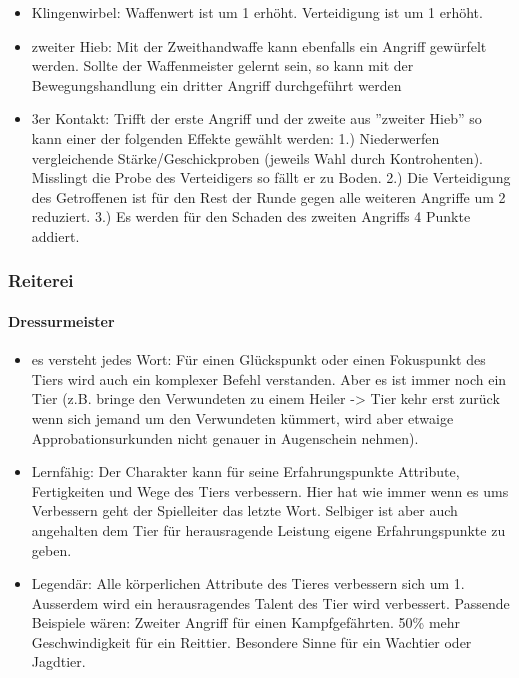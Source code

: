 \documentclass{article}
\begin{document}
\begin{itemize}
\item Klingenwirbel: Waffenwert ist um 1 erhöht. Verteidigung ist um 1 erhöht.
\item zweiter Hieb: Mit der Zweithandwaffe kann ebenfalls ein Angriff gewürfelt werden. Sollte der Waffenmeister gelernt sein, so kann mit der Bewegungshandlung ein dritter Angriff durchgeführt werden 
\item 3er Kontakt: Trifft der erste Angriff und der zweite aus ''zweiter Hieb'' so kann einer der folgenden Effekte gewählt werden: 1.) Niederwerfen vergleichende Stärke/Geschickproben (jeweils Wahl durch Kontrohenten). Misslingt die Probe des Verteidigers so fällt er zu Boden. 2.) Die Verteidigung des Getroffenen ist für den Rest der Runde gegen alle weiteren Angriffe um 2 reduziert. 3.) Es werden für den Schaden des zweiten Angriffs 4 Punkte addiert.
\end{itemize}

\subsubsection{Reiterei}

\paragraph{Dressurmeister}

\begin{itemize}
\item es versteht jedes Wort: Für einen Glückspunkt oder einen Fokuspunkt des Tiers wird auch ein komplexer Befehl verstanden. Aber es ist immer noch ein Tier (z.B. bringe den Verwundeten zu einem Heiler -> Tier kehr erst zurück wenn sich jemand um den Verwundeten kümmert, wird aber etwaige Approbationsurkunden nicht genauer in Augenschein nehmen).
\item Lernfähig: Der Charakter kann für seine Erfahrungspunkte Attribute, Fertigkeiten und Wege des Tiers verbessern. Hier hat wie immer wenn es ums Verbessern geht der Spielleiter das letzte Wort. Selbiger ist aber auch angehalten dem Tier für herausragende Leistung eigene Erfahrungspunkte zu geben.
\item Legendär: Alle körperlichen Attribute des Tieres verbessern sich um 1. Ausserdem wird ein herausragendes Talent des Tier wird verbessert. Passende Beispiele wären: Zweiter Angriff für einen Kampfgefährten. 50\% mehr Geschwindigkeit für ein Reittier. Besondere Sinne für ein Wachtier oder Jagdtier.
\end{itemize}
\end{document}
